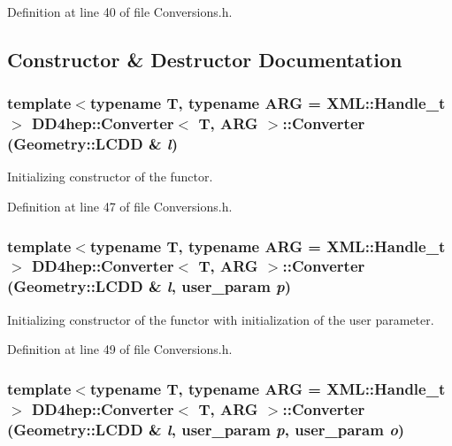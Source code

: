 Definition at line 40 of file Conversions.h.

\subsection{Constructor \& Destructor Documentation}
\hypertarget{struct_d_d4hep_1_1_converter_ab693f490d06d475fb15dc360ed45015f}{
\subsubsection[{Converter}]{\setlength{\rightskip}{0pt plus 5cm}template$<$typename T, typename ARG = XML::Handle\_\-t$>$ {\bf DD4hep::Converter}$<$ {\bf T}, ARG $>$::{\bf Converter} ({\bf Geometry::LCDD} \& {\em l})}}
\label{struct_d_d4hep_1_1_converter_ab693f490d06d475fb15dc360ed45015f}


Initializing constructor of the functor. 

Definition at line 47 of file Conversions.h.\hypertarget{struct_d_d4hep_1_1_converter_a46856eb07ef211b0e78d2ce8b336a213}{
\subsubsection[{Converter}]{\setlength{\rightskip}{0pt plus 5cm}template$<$typename T, typename ARG = XML::Handle\_\-t$>$ {\bf DD4hep::Converter}$<$ {\bf T}, ARG $>$::{\bf Converter} ({\bf Geometry::LCDD} \& {\em l}, \/  {\bf user\_\-param} {\em p})}}
\label{struct_d_d4hep_1_1_converter_a46856eb07ef211b0e78d2ce8b336a213}


Initializing constructor of the functor with initialization of the user parameter. 

Definition at line 49 of file Conversions.h.\hypertarget{struct_d_d4hep_1_1_converter_ac18342c9491be390a9329d2ae05b0bb6}{
\subsubsection[{Converter}]{\setlength{\rightskip}{0pt plus 5cm}template$<$typename T, typename ARG = XML::Handle\_\-t$>$ {\bf DD4hep::Converter}$<$ {\bf T}, ARG $>$::{\bf Converter} ({\bf Geometry::LCDD} \& {\em l}, \/  {\bf user\_\-param} {\em p}, \/  {\bf user\_\-param} {\em o})}}
\label{struct_d_d4hep_1_1_converter_ac18342c9491be390a9329d2ae05b0bb6}


